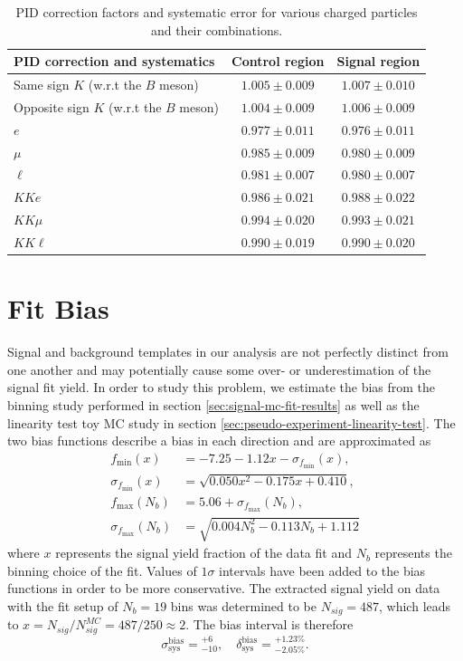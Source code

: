 \begin{table}[H]
	\centering
	\begin{tabular}{|l|c|c|}
		\hline
		PID correction and systematics & Control region & Signal region \\
		\hline
		Same sign $K$ (w.r.t the $B$ meson) & $1.005\pm 0.009$ & $1.007\pm 0.010$\\
		\hline
		Opposite sign $K$ (w.r.t the $B$ meson) & $1.004\pm 0.009$ & $1.006\pm 0.009$\\
		\hline
		$e$ & $0.977\pm 0.011$ & $0.976\pm 0.011$\\
		\hline
		$\mu$ & $0.985\pm 0.009$ & $0.980\pm 0.009$\\
		\hline
		$\ell$ & $0.981\pm 0.007$ & $0.980\pm 0.007$\\
		\hline
		\hline
		$KKe$ & $0.986 \pm 0.021$ & $0.988\pm 0.022$\\
		\hline
		$KK\mu$ & $0.994 \pm 0.020$ & $0.993\pm 0.021$\\
		\hline
		$KK\ell$ & $0.990 \pm 0.019$ & $0.990\pm 0.020$\\
		\hline
	\end{tabular}
	\caption{PID correction factors and systematic error for various charged particles and their combinations.}
	\label{tab:PID}
\end{table}

\section{Fit Bias}
Signal and background templates in our analysis are not perfectly distinct from one another and may potentially cause some over- or underestimation of the signal fit yield. In order to study this problem, we estimate the bias from the binning study performed in section \ref{sec:signal-mc-fit-results} as well as the linearity test toy MC study in section \ref{sec:pseudo-experiment-linearity-test}. The two bias functions describe a bias in each direction and are approximated as
\begin{align}
f_{\mathrm{min}}(x) &= -7.25-1.12x - \sigma_{f_{\mathrm{min}}}(x), \\
\sigma_{f_{\mathrm{min}}}(x) &= \sqrt{0.050 x^2 - 0.175 x + 0.410}, \\
f_{\mathrm{max}}(N_b) &= 5.06 + \sigma_{f_{\mathrm{max}}}(N_b), \\
\sigma_{f_{\mathrm{max}}}(N_b) &= \sqrt{0.004N_b^2 - 0.113 N_b + 1.112}
\end{align}
where $x$ represents the signal yield fraction of the data fit and $N_b$ represents the binning choice of the fit. Values of $1\sigma$ intervals have been added to the bias functions in order to be more conservative. The extracted signal yield on data  with the fit setup of $N_b=19$ bins was determined to be $N_{sig} = 487$, which leads to $x = N_{sig} / N_{sig}^{MC} = 487 / 250 \approx 2$. The bias interval is therefore
\begin{equation}
\sigma_{\mathrm{sys}}^{\mathrm{bias}} = {}^{+6}_{-10},\quad \delta_{\mathrm{sys}}^{\mathrm{bias}} = {}^{+1.23\%}_{-2.05\%}.
\end{equation}

